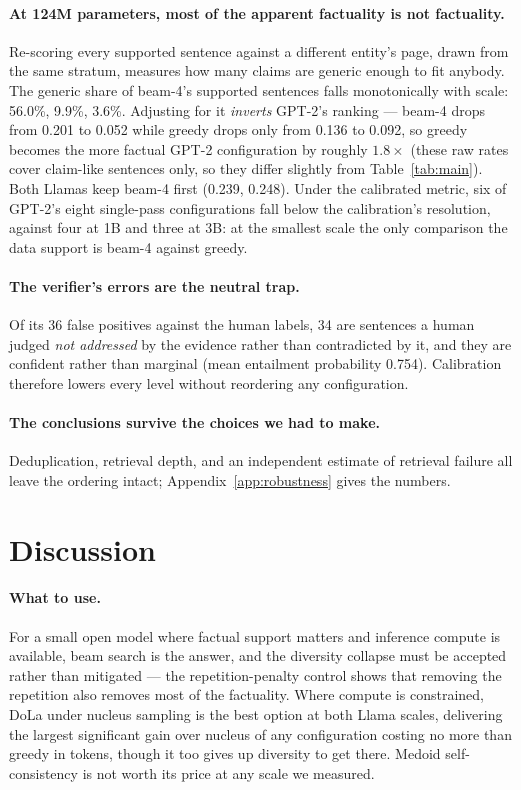 \documentclass[11pt]{article}
\begin{document}
\paragraph{At 124M parameters, most of the apparent factuality is not
factuality.} Re-scoring every supported sentence against a different entity's
page, drawn from the same stratum, measures how many claims are generic enough
to fit anybody. The generic share of beam-4's supported sentences falls
monotonically with scale: 56.0\%, 9.9\%, 3.6\%. Adjusting for it
\emph{inverts} GPT-2's ranking --- beam-4 drops from 0.201 to 0.052 while
greedy drops only from 0.136 to 0.092, so greedy becomes the more factual GPT-2
configuration by roughly $1.8\times$ (these raw rates cover claim-like
sentences only, so they differ slightly from Table~\ref{tab:main}). Both Llamas keep beam-4 first (0.239, 0.248). Under the
calibrated metric, six of GPT-2's eight single-pass configurations fall below
the calibration's resolution, against four at 1B and three at 3B:
at the smallest scale the only comparison the data support is beam-4 against
greedy.

\paragraph{The verifier's errors are the neutral trap.} Of its 36 false
positives against the human labels, 34 are sentences a human judged \emph{not
addressed} by the evidence rather than contradicted by it, and they are
confident rather than marginal (mean entailment probability 0.754). Calibration
therefore lowers every level without reordering any configuration.

\paragraph{The conclusions survive the choices we had to make.}
Deduplication, retrieval depth, and an independent estimate of retrieval
failure all leave the ordering intact; Appendix~\ref{app:robustness} gives the
numbers.



\section{Discussion}

\paragraph{What to use.} For a small open model where factual support matters
and inference compute is available, beam search is the answer, and the
diversity collapse must be accepted rather than mitigated --- the
repetition-penalty control shows that removing the repetition also removes most
of the factuality. Where compute is constrained, DoLa under nucleus sampling is
the best option at both Llama scales, delivering the largest significant gain
over nucleus of any configuration costing no more than greedy in tokens, though
it too gives up diversity to get there.
Medoid self-consistency is not worth its price at any scale we measured.
\end{document}
